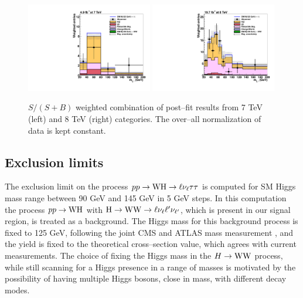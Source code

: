 \begin{figure}
\begin{center}
  \includegraphics[width=0.49\textwidth]{4_Analisys/pics/postfit/postfit_ssb_weight_7TeV.pdf}
  \includegraphics[width=0.49\textwidth]{4_Analisys/pics/postfit/postfit_ssb_weight_8TeV.pdf}\\
  \caption{$S / (S+B)$ weighted combination of post--fit results from 7 TeV (left) and 8 TeV (right) categories. The over--all normalization of data is kept constant.}
  \label{fig:sbweight}
\end{center}
\end{figure}


\subsection{Exclusion limits}

The exclusion limit on the process $pp\rightarrow\mathrm{W}\mathrm{H}\rightarrow\ell\nu_\ell\tau\tau$ is computed for SM Higgs mass range between 90 GeV and 145 GeV in 5 GeV steps. In this computation the process $pp\rightarrow\mathrm{W}\mathrm{H}$ with $\mathrm{H}\rightarrow\mathrm{W}\mathrm{W}\rightarrow\ell\nu_{\ell}\ell'\nu_{\ell'}$, which is present in our signal region, is treated as a background. The Higgs mass for this background process is fixed to 125 GeV, following the joint CMS and ATLAS mass measurement \cite{CMS:2014ega, Aad:2014aba}, and the yield is fixed to the theoretical cross--section value, which agrees with current measurements. The choice of fixing the Higgs mass in the $H\rightarrow\mathrm{W}\mathrm{W}$ process, while still scanning for a Higgs presence in a range of masses is motivated by the possibility of having multiple Higgs bosons, close in mass, with different decay modes.

